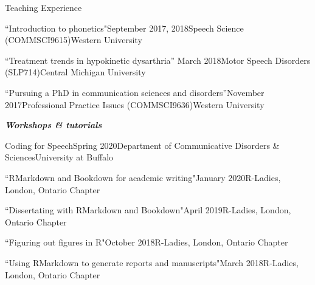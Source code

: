 \documentclass{resume} %
\begin{document}
\begin{rSection}{Teaching Experience}
	\begin{rSubsection}{``Introduction to phonetics"}{September 2017, 2018}{Speech Science (COMMSCI9615)}{Western University}
	\end{rSubsection}

	\begin{rSubsection}{``Treatment trends in hypokinetic dysarthria'' }{March 2018}{Motor Speech Disorders (SLP714)}{Central Michigan University}
	\end{rSubsection}
	
	\begin{rSubsection}{``Pursuing a PhD in communication sciences and disorders''}{November 2017}{Professional Practice Issues (COMMSCI9636)}{Western University}
	\end{rSubsection}

\begin{center}
		{\bf \emph{Workshops \& tutorials}}
\end{center}

	\begin{rSubsection}{Coding for Speech}{Spring 2020}{Department of Communicative Disorders \& Sciences}{University at Buffalo}
	\end{rSubsection}

	\begin{rSubsection}{``RMarkdown and Bookdown for academic writing"}{January 2020}{R-Ladies, London, Ontario Chapter}{}
	\end{rSubsection}

	\begin{rSubsection}{``Dissertating with RMarkdown and Bookdown"}{April 2019}{R-Ladies, London, Ontario Chapter}{}
	\end{rSubsection}
	
	\begin{rSubsection}{``Figuring out figures in R"}{October 2018}{R-Ladies, London, Ontario Chapter}{}
	\end{rSubsection}
	
	
	\begin{rSubsection}{``Using RMarkdown to generate reports and manuscripts"}{March 2018}{R-Ladies, London, Ontario Chapter}{}
	\end{rSubsection}
	

\end{rSection}
\end{document}
